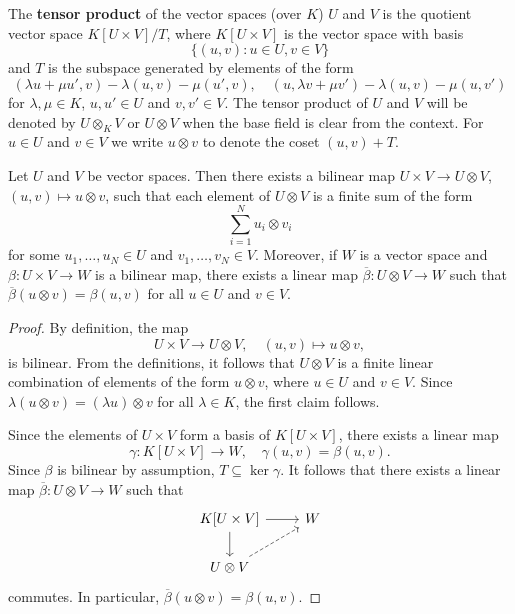 \chapter{}
\label{11}


The \textbf{tensor product} of the vector spaces (over $K$) $U$ and $V$ 
is the quotient vector space $K[U\times V]/T$, where $K[U\times V]$ 
is the vector space with basis 
\[
\{(u,v):u\in U,v\in V\}
\]
and $T$ is the subspace 
generated by elements of the form 
\[
		(\lambda u+\mu u',v)-\lambda(u,v)-\mu(u',v),\quad
		(u,\lambda v+\mu v')-\lambda(u,v)-\mu(u,v')
	\]
for $\lambda,\mu\in K$, $u,u'\in U$ and $v,v'\in V$.
The tensor product of $U$ and $V$ will be denoted by $U\otimes_KV$ or 
$U\otimes V$ when the base field is clear from the context. For $u\in U$ and 
$v\in V$ we write $u\otimes v$ to denote the coset $(u,v)+T$.

\begin{theorem}
	Let $U$ and $V$ be vector spaces. Then there exists a bilinear map 
	$U\times V\to U\otimes V$, $(u,v)\mapsto u\otimes v$, such that 
	each element of $U\otimes V$ is a finite sum of the form 
	\[
		\sum_{i=1}^N u_i\otimes v_i
	\]
	for some $u_1,\dots,u_N\in U$ and $v_1,\dots,v_N\in V$. 
	Moreover, if $W$ is a vector space and $\beta\colon U\times V\to W$ is a bilinear map, 
	there exists a linear map 
	$\overline{\beta}\colon U\otimes V\to W$ such that $\overline{\beta}(u\otimes
	v)=\beta(u,v)$ for all $u\in U$ and $v\in V$.
\end{theorem}

\begin{proof}
    By definition, the map
    \[
	U\times V\to U\otimes V,\quad
	(u,v)\mapsto u\otimes v,
	\]
	is bilinear. From the definitions, it follows that
	$U\otimes V$ is a finite linear combination of elements of the form 
	$u\otimes v$, where $u\in U$ and $v\in V$. Since $\lambda(u\otimes
	v)=(\lambda u)\otimes v$ for all $\lambda\in K$, the first claim follows.

	Since the elements of $U\times V$ form a basis of $K[U\times V]$, there exists
	a linear map 
	\[
		\gamma\colon K[U\times V]\to W,\quad
	\gamma(u,v)=\beta(u,v). 
	\]
	Since $\beta$ is bilinear by assumption, $T\subseteq\ker\gamma$. It follows that there exists 
	a linear map $\overline{\beta}\colon U\otimes V\to
	W$ such that  
	\[
	\begin{tikzcd}
		K[U\times V] \arrow[r]\arrow[d] & W \\
		U\otimes V\arrow[ur, dashrightarrow]
	\end{tikzcd}
	\]
	commutes. In particular, $\overline{\beta}(u\otimes v)=\beta(u,v)$. 
\end{proof}

